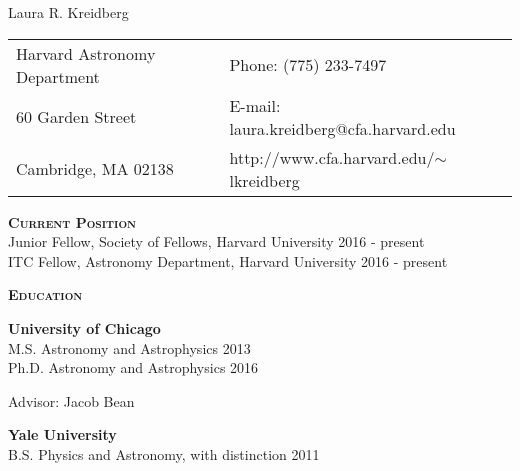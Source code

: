 \documentclass[12pt,letterpaper]{article}
\def\name{Laura R. Kreidberg}
\renewenvironment{itemize}{
	\begin{list}{}{
	\setlength{\leftmargin}{1mm}%
	\setlength{\itemsep}{0pt}%
	\setlength{\parskip}{0pt}
	}
}{
	\end{list}
}
\begin{document}
\sloppy

{\LARGE \name}


\vspace{3 mm}

\begin{tabular}{@{}p{4.0in}@{}p{5.0in}}
Harvard Astronomy Department         & Phone: (775) 233-7497 \\
60 Garden Street                     & E-mail: laura.kreidberg@cfa.harvard.edu\\ 
Cambridge, MA 02138                  & http://www.cfa.harvard.edu/$\sim$lkreidberg \\ 
\end{tabular}

\vspace{8mm}

\textbf{\textsc{Current Position}}\\
Junior Fellow, Society of Fellows, Harvard University \hfill 2016 - present\\
ITC Fellow, Astronomy Department, Harvard University \hfill 2016 - present\\

\vspace{1mm}

\textbf{\textsc{Education}}
\vspace{-3mm}
\begin{itemize}
\item{\textbf{University of Chicago}} \\
M.S. Astronomy and Astrophysics \hfill 2013\\
Ph.D. Astronomy and Astrophysics \hfill 2016\\
\addtolength{\itemindent}{0.3 cm}
\vspace{-7mm}
\item{Advisor: Jacob Bean}
\addtolength{\itemindent}{-0.3 cm}
\item{\textbf{Yale University}} \\
B.S. Physics and Astronomy, with distinction \hfill 2011
\end{itemize}
\end{document}
